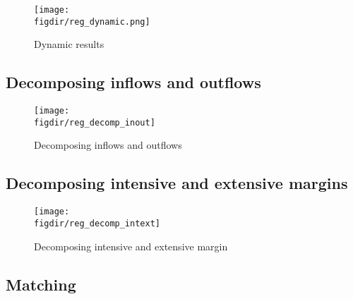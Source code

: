 

\begin{figure}[H]
    \centering
    \texttt{[image: \\figdir/reg\_dynamic.png]}
    \caption{Dynamic results}%
    \label{fig:reg_dynamic}
\end{figure}


\subsection{Decomposing inflows and outflows}%
\label{sub:decomposing_inflows_and_outflows}

\begin{figure}[H]
    \centering
    \texttt{[image: \\figdir/reg\_decomp\_inout]}
    \caption{Decomposing inflows and outflows}%
    \label{fig:reg_decomp_inout}
\end{figure}


\subsection{Decomposing intensive and extensive margins}%
\label{sub:decomposing_intensive_and_extensive_margins}

\begin{figure}[H]
    \centering
    \texttt{[image: \\figdir/reg\_decomp\_intext]}
    \caption{Decomposing intensive and extensive margin}%
    \label{fig:reg_decomp_intext}
\end{figure}


\subsection{Matching}%
\label{sub:alternative_matching_method}

